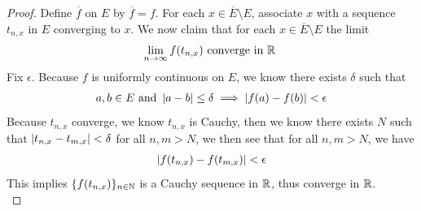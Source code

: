 \documentclass{report}
\begin{document}
\begin{proof}
Define $\overline{f}$ on $E$ by $\overline{f}=f$. For each $x \in \overline{E}\setminus E$, associate $x$ with a sequence $t_{n,x}$ in $E$ converging to  $x$.  We now claim that for each $x\in \overline{E}\setminus E$ the limit 
\begin{align*}
\lim_{n\to \infty}f(t_{n,x})\text{ converge in $\mathbb{R}$ }
\end{align*}
Fix $\epsilon $. Because $f$ is uniformly continuous on $E$, we know there exists  $\delta$ such that 
\begin{align*}
a,b \in E \text{ and } \left|a-b\right|\leq \delta \implies \left|f(a)-f(b)\right|< \epsilon 
\end{align*}
Because $t_{n,x}$ converge, we know $t_{n,x}$ is Cauchy, then we know there exists $N$ such that $\left|t_{n,x}-t_{m,x}\right|<\delta$ for all $n,m>N$, we then see that for all $n,m>N$, we have 
 \begin{align*}
\left|f(t_{n,x})-f(t_{m,x})\right|<\epsilon 
\end{align*}
This implies $\{ f(t_{n,x}) \}_{n\in\mathbb{N}}$ is a Cauchy sequence in $\mathbb{R}$, thus converge in $\mathbb{R}$.  \\


\end{proof}
\end{document}
